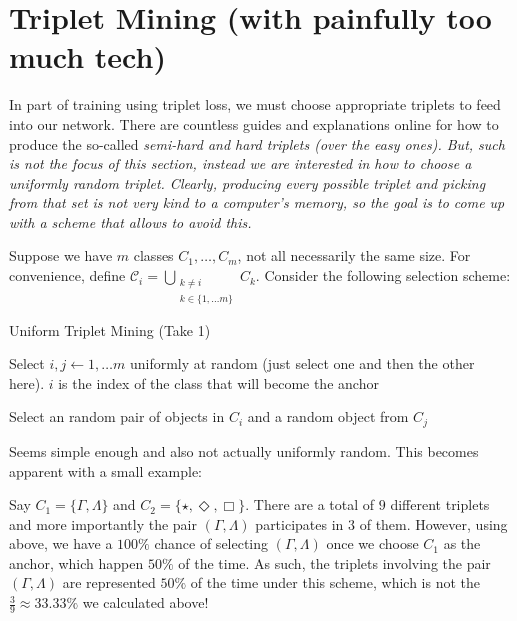 \section{Triplet Mining (with painfully too much tech)}

In part of training using triplet loss, we must choose appropriate triplets to feed into our network.
There are countless guides and explanations online for how to produce the so-called \it{semi-hard} and \it{hard} triplets (over the \it{easy} ones).
But, such is not the focus of this section, instead we are interested in how to choose a uniformly random triplet.
Clearly, producing every possible triplet and picking from that set is not very kind to a computer's memory, so the goal is to come up with a scheme that allows to avoid this.

Suppose we have $m$ classes $C_1, \ldots, C_m$, not all necessarily the same size.
For convenience, define $\mathscr{C}_i = \bigcup_{\substack{k \neq i \\ k \in \{1, \ldots m\}}} C_k$.
Consider the following selection scheme:

\begin{algorithm}
    \caption{Uniform Triplet Mining (Take 1)}\label{Algorithm:appendix-triplet-mining:uniform-triplet-mining-take-one}

    \nl Select $i, j \longleftarrow {1, \ldots m}$ uniformly at random (just select one and then the other here). $i$ is the index of the class that will become the anchor

    \nl Select an random pair of objects in $C_i$ and a random object from $C_j$
\end{algorithm}

Seems simple enough and also not actually uniformly random.
This becomes apparent with a small example: 

\begin{changemargin}{1cm}{1cm}
Say $C_1 = \{\Gamma, \Lambda\}$ and $C_2 = \{\star, \Diamond, \Box\}$.
There are a total of $9$ different triplets and more importantly the pair $(\Gamma, \Lambda)$ participates in $3$ of them.
However, using  above, we have a $100\%$ chance of selecting $(\Gamma, \Lambda)$ once we choose $C_1$ as the anchor, which happen $50\%$ of the time.
As such, the triplets involving the pair $(\Gamma, \Lambda)$ are represented $50\%$ of the time under this scheme, which is not the $\frac{3}{9} \approx 33.33\%$ we calculated above!
\end{changemargin}

